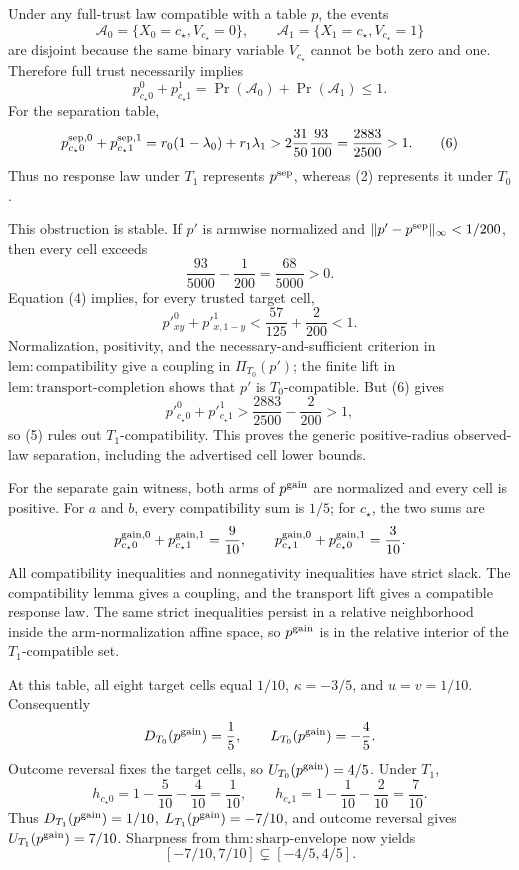 Under any full-trust law compatible with a table \(p\), the events
\[
 \mathcal A_0=\{X_0=c_\star,V_{c_\star}=0\},
 \qquad
 \mathcal A_1=\{X_1=c_\star,V_{c_\star}=1\}
\]
are disjoint because the same binary variable \(V_{c_\star}\) cannot be
both zero and one.  Therefore full trust necessarily implies
\[
 p^0_{c_\star0}+p^1_{c_\star1}
 =\Pr(\mathcal A_0)+\Pr(\mathcal A_1)\le1. \tag{5}
\]
For the separation table,
\[
 p^{{\rm sep},0}_{c_\star0}+p^{{\rm sep},1}_{c_\star1}
 =r_0(1-\lambda_0)+r_1\lambda_1
 >2\frac{31}{50}\frac{93}{100}
 =\frac{2883}{2500}>1. \tag{6}
\]
Thus no response law under \(T_1\) represents \(p^{\rm sep}\), whereas
(2) represents it under \(T_0\).

This obstruction is stable.  If \(p'\) is armwise normalized and
\(\lVert p'-p^{\rm sep}\rVert_\infty<1/200\), then every cell exceeds
\[
 \frac{93}{5000}-\frac1{200}=\frac{68}{5000}>0.
\]
Equation (4) implies, for every trusted target cell,
\[
 p'^0_{xy}+p'^1_{x,1-y}
 <\frac{57}{125}+\frac2{200}<1.
\]
Normalization, positivity, and the necessary-and-sufficient criterion in
\(\mathrm{lem{:}compatibility}\) give a coupling in \(\Pi_{T_0}(p')\);
the finite lift in \(\mathrm{lem{:}transport\mbox{-}completion}\) shows
that \(p'\) is \(T_0\)-compatible.  But (6) gives
\[
 p'^0_{c_\star0}+p'^1_{c_\star1}
 >\frac{2883}{2500}-\frac2{200}>1,
\]
so (5) rules out \(T_1\)-compatibility.  This proves the generic
positive-radius observed-law separation, including the advertised cell
lower bounds.

For the separate gain witness, both arms of \(p^{\rm gain}\) are normalized
and every cell is positive.  For \(a\) and \(b\), every compatibility sum is
\(1/5\); for \(c_\star\), the two sums are
\[
 p^{{\rm gain},0}_{c_\star0}+p^{{\rm gain},1}_{c_\star1}=\frac9{10},
 \qquad
 p^{{\rm gain},0}_{c_\star1}+p^{{\rm gain},1}_{c_\star0}=\frac3{10}.
\]
All compatibility inequalities and nonnegativity inequalities have strict
slack.  The compatibility lemma gives a coupling, and the transport lift
gives a compatible response law.  The same strict inequalities persist in
a relative neighborhood inside the arm-normalization affine space, so
\(p^{\rm gain}\) is in the relative interior of the \(T_1\)-compatible set.

At this table, all eight target cells equal \(1/10\),
\(\kappa=-3/5\), and \(u=v=1/10\).  Consequently
\[
 D_{T_0}(p^{\rm gain})=\frac15,
 \qquad L_{T_0}(p^{\rm gain})=-\frac45.
\]
Outcome reversal fixes the target cells, so \(U_{T_0}(p^{\rm gain})=4/5\).
Under \(T_1\),
\[
 h_{c_\star0}=1-\frac5{10}-\frac4{10}=\frac1{10},
 \qquad
 h_{c_\star1}=1-\frac1{10}-\frac2{10}=\frac7{10}.
\]
Thus \(D_{T_1}(p^{\rm gain})=1/10\),
\(L_{T_1}(p^{\rm gain})=-7/10\), and outcome reversal gives
\(U_{T_1}(p^{\rm gain})=7/10\).  Sharpness from
\(\mathrm{thm{:}sharp\mbox{-}envelope}\) now yields
\[
 [-7/10,7/10]\subsetneq[-4/5,4/5]. \tag{7}
\]

